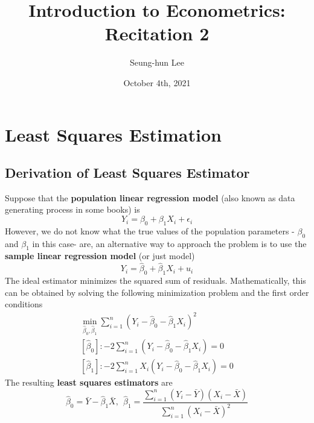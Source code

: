\documentclass[12pt]{article}
\title{Introduction to Econometrics: Recitation 2}
\theoremstyle{definition}
\theoremstyle{property}
\theoremstyle{assumption}
\theoremstyle{example}
\theoremstyle{comment}
\begin{document}
\linespread{1.25}
\author{Seung-hun Lee}
\date{October 4th, 2021 }
\maketitle
\section{Least Squares Estimation}
\subsection{Derivation of Least Squares Estimator}
Suppose that the \textbf{population linear regression model} (also known as data generating process in some books) is
\[
Y_i = \beta_0 + \beta_1X_i + \epsilon_i
\]
However, we do not know what the true values of the population parameters - $\beta_0$ and $\beta_1$ in this case- are, an alternative way to approach the problem is to use the \textbf{sample linear regression model} (or just model)
\[
Y_i = \hat{\beta}_0 +\hat{\beta}_1X_i +u_i
\]
The ideal estimator minimizes the squared sum of residuals. Mathematically, this can be obtained by solving the following minimization problem and the first order conditions
\footnotesize{\begin{gather*}
\min_{\hat{\beta}_0, \hat{\beta}_1} \sum_{i=1}^n (Y_i-\hat{\beta}_0 - \hat{\beta}_1X_i)^2\\
[\hat{\beta}_0]: -2\sum_{i=1}^n(Y_i-\hat{\beta}_0-\hat{\beta}_1X_i)=0\\
[\hat{\beta}_1]: -2\sum_{i=1}^nX_i(Y_i-\hat{\beta}_0-\hat{\beta}_1X_i)=0 
\end{gather*}}\normalsize
The resulting \textbf{least squares estimators} are
\[
\hat{\beta}_0 = \bar{Y}-\hat{\beta}_1\bar{X}, \ \ \hat{\beta}_1=\frac{\sum_{i=1}^n(Y_i-\bar{Y})(X_i-\bar{X})}{\sum_{i=1}^n(X_i-\bar{X})^2}
\]
\end{document}
